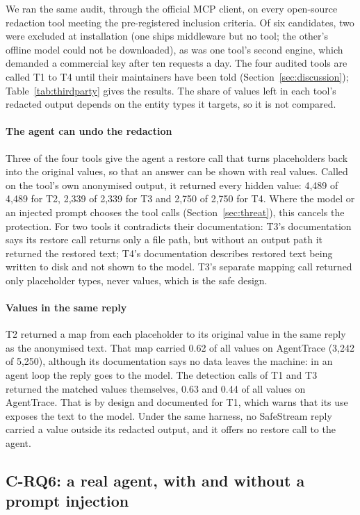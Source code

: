 \documentclass[conference]{IEEEtran}
\begin{document}
We ran the same audit, through the official MCP client, on every open-source redaction tool meeting the pre-registered inclusion criteria. Of six candidates, two were excluded at installation (one ships middleware but no tool; the other's offline model could not be downloaded), as was one tool's second engine, which demanded a commercial key after ten requests a day. The four audited tools are called T1 to T4 until their maintainers have been told (Section~\ref{sec:discussion}); Table~\ref{tab:thirdparty} gives the results. The share of values left in each tool's redacted output depends on the entity types it targets, so it is not compared.

\paragraph{The agent can undo the redaction} Three of the four tools give the agent a restore call that turns placeholders back into the original values, so that an answer can be shown with real values. Called on the tool's own anonymised output, it returned every hidden value: 4,489 of 4,489 for T2, 2,339 of 2,339 for T3 and 2,750 of 2,750 for T4. Where the model or an injected prompt chooses the tool calls (Section~\ref{sec:threat}), this cancels the protection. For two tools it contradicts their documentation: T3's documentation says its restore call returns only a file path, but without an output path it returned the restored text; T4's documentation describes restored text being written to disk and not shown to the model. T3's separate mapping call returned only placeholder types, never values, which is the safe design.

\paragraph{Values in the same reply} T2 returned a map from each placeholder to its original value in the same reply as the anonymised text. That map carried 0.62 of all values on AgentTrace (3,242 of 5,250), although its documentation says no data leaves the machine: in an agent loop the reply goes to the model. The detection calls of T1 and T3 returned the matched values themselves, 0.63 and 0.44 of all values on AgentTrace. That is by design and documented for T1, which warns that its use exposes the text to the model. Under the same harness, no SafeStream reply carried a value outside its redacted output, and it offers no restore call to the agent.

\subsection{C-RQ6: a real agent, with and without a prompt injection}\label{sec:agent}
\end{document}
